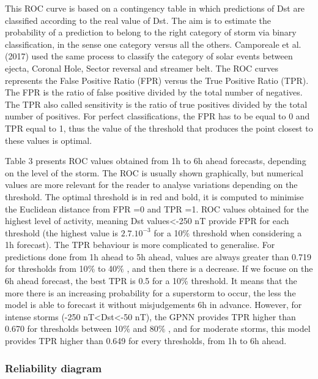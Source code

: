 This ROC curve is based on a contingency table in which predictions of Dst are classified according to the 
real value of Dst. The aim is to estimate the probability of a prediction to belong to the right category of storm 
via binary classification, in the sense one category versus all the others. Camporeale et al. (2017) used the 
same process to classify the category of solar events between ejecta, Coronal Hole, Sector reversal and streamer belt. 
The ROC curves represents the False Positive Ratio (FPR) versus the True Positive Ratio (TPR). The FPR is the ratio 
of false positive divided by the total number of negatives. The TPR also called sensitivity is the ratio of 
true positives divided by the total number of positives. For perfect classifications, the FPR has to be equal to 0 
and TPR equal to 1, thus the value of the threshold that produces the point closest to these values is optimal. 


Table 3 presents ROC values obtained from 1h to 6h ahead forecasts, depending on the level of the storm. 
The ROC is usually shown graphically, but numerical values are more relevant for the reader to analyse 
variations depending on the threshold. The optimal threshold is in red and bold, it is computed to 
minimise the Euclidean distance from FPR =0 and TPR =1. ROC values obtained for the highest level of activity, 
meaning Dst values<-250 nT provide FPR for each threshold 
(the highest value is $2.7.10^{-3}$ for a 10$\%$  threshold when considering a 1h forecast). 
The TPR behaviour is more complicated to generalise. For predictions done from 1h ahead to 5h ahead, 
values are always greater than 0.719 for thresholds from 10$\%$  to 40$\%$ , and then there is a decrease. 
If we focuse on the 6h ahead forecast, the best TPR is 0.5 for a 10$\%$  threshold. It means that the more 
there is an increasing probability for a superstorm to occur, the less the model is able to forecast it 
without misjudgements 6h in advance. However, for intense storms (-250 nT<Dst<-50 nT), the GPNN provides 
TPR higher than 0.670 for thresholds between 10$\%$  and 80$\%$ , and for moderate storms, this model provides 
TPR higher than 0.649 for every thresholds, from 1h to 6h ahead. 


\subsubsection{Reliability diagram}


